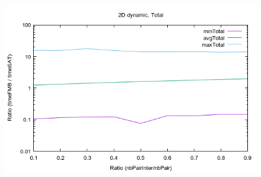 \documentclass[12pt, a4paper]{article}
\begin{document}
\begin{scriptsize}
\begin{ttfamily}

\end{ttfamily}
\end{scriptsize}

\begin{center}
\begin{figure}[H]
\centering\includegraphics[width=12cm]{../Results/qualification2DTime.png}\\
\end{figure}
\end{center}
\end{document}
